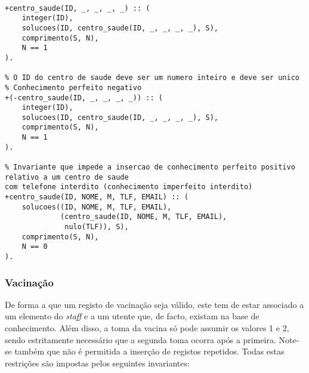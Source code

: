\

\begin{lstlisting}[caption={Invariante de inserção relativo ao predicado \texttt{centro\_saude}}]
% O ID do centro de saude deve ser um numero inteiro e deve ser unico
+centro_saude(ID, _, _, _, _) :: (
    integer(ID),
    solucoes(ID, centro_saude(ID, _, _, _, _), S),
    comprimento(S, N),
    N == 1
).

% O ID do centro de saude deve ser um numero inteiro e deve ser unico
% Conhecimento perfeito negativo
+(-centro_saude(ID, _, _, _, _)) :: (
    integer(ID),
    solucoes(ID, centro_saude(ID, _, _, _, _), S),
    comprimento(S, N),
    N == 1
).

% Invariante que impede a insercao de conhecimento perfeito positivo relativo a um centro de saude 
com telefone interdito (conhecimento imperfeito interdito)
+centro_saude(ID, NOME, M, TLF, EMAIL) :: (
    solucoes((ID, NOME, M, TLF, EMAIL),
             (centro_saude(ID, NOME, M, TLF, EMAIL),
              nulo(TLF)), S),
    comprimento(S, N),
    N == 0
).
\end{lstlisting}

\subsubsection*{Vacinação}
De forma a que um registo de vacinação seja válido, este tem de estar associado a um elemento do 
\textit{staff} e a um
utente que, de facto, existam na base de conhecimento. Além disso, a toma da vacina só pode 
assumir os valores 1 e 2,
sendo estritamente necessário que a segunda toma ocorra após a primeira. Note-se também que não 
é permitida a inserção de
registos repetidos. Todas estas restrições são impostas pelos seguintes invariantes:

\

